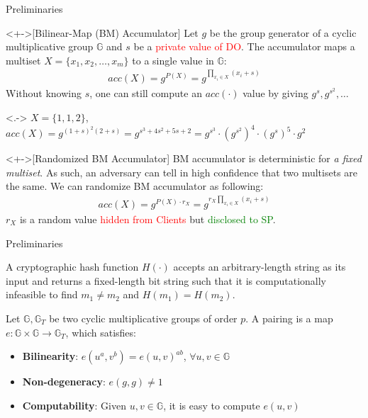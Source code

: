 \documentclass[xcolor={dvipsnames},aspectratio=169,10pt]{beamer}
\begin{document}
\begin{frame}{Preliminaries}
  \begin{definition}<+->[Bilinear-Map (BM) Accumulator]
    Let $g$ be the group generator of a cyclic multiplicative group $\mathbb{G}$ and $s$ be a \textcolor{Red}{private value of DO}. The accumulator maps a multiset $X = \{ x_1, x_2, \dotsc, x_m \}$ to a single value in $\mathbb{G}$:
    \begin{align*}
      acc(X) = g^{P(X)} = g^{\prod_{x_i \in X}(x_i + s)}
    \end{align*}
    Without knowing $s$, one can still compute an $acc(\cdot)$ value by giving $g^s, g^{s^2}, \dotsc$
  \end{definition}
  \begin{example}<.->
    $X = \{ 1, 1, 2 \}$, $acc(X) = g^{{(1+s)}^2(2+s)} = g^{s^3+4 s^2+5 s+2} = g^{s^3} \cdot {(g^{s^2})}^4 \cdot {(g^s)}^5 \cdot g^2$
  \end{example}
  \begin{definition}<+->[Randomized BM Accumulator]
    BM accumulator is \alert{deterministic} for \emph{a fixed multiset}. As such, an adversary can tell in high confidence that two multisets are the same. We can randomize BM accumulator as following:
    \begin{align*}
      acc(X) = g^{P(X) \cdot r_X} = g^{r_X\prod_{x_i \in X}(x_i + s)}
    \end{align*}
    $r_X$ is a random value \textcolor{Red}{hidden from Clients} but \textcolor{Green}{disclosed to SP}.
  \end{definition}
\end{frame}

\begin{frame}{Preliminaries}
  \begin{definition}
    A cryptographic hash function $H(\cdot)$ accepts an arbitrary-length string as its input and returns a fixed-length bit string such that it is computationally infeasible to find $m_1 \neq m_2$ and $H(m_1) = H(m_2)$.
  \end{definition}
  \begin{definition}
    Let $\mathbb{G}, \mathbb{G}_T$ be two cyclic multiplicative groups of order $p$.
    A pairing is a map $e: \mathbb{G} \times \mathbb{G} \to \mathbb{G}_T$, which satisfies:
    \begin{itemize}
      \item \textbf{Bilinearity}: $e(u^a,v^b) = {e(u,v)}^{ab}$, $\forall u, v \in \mathbb{G}$
      \item \textbf{Non-degeneracy}: $e(g,g) \ne 1$
      \item \textbf{Computability}: Given $u, v \in \mathbb{G}$, it is easy to compute $e(u, v)$
    \end{itemize}
  \end{definition}
\end{frame}
\end{document}
